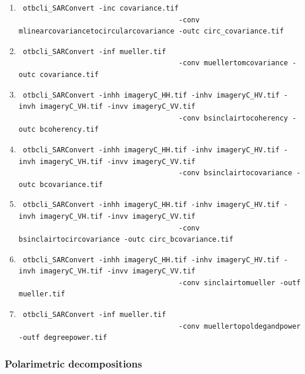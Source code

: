 \begin{enumerate}
\item \begin{verbatim} otbcli_SARConvert -inc covariance.tif 
									  -conv mlinearcovariancetocircularcovariance -outc circ_covariance.tif \end{verbatim}	
									  			
\item \begin{verbatim} otbcli_SARConvert -inf mueller.tif 
									  -conv muellertomcovariance -outc covariance.tif \end{verbatim}	
									  								  
\item \begin{verbatim} otbcli_SARConvert -inhh imageryC_HH.tif -inhv imageryC_HV.tif -invh imageryC_VH.tif -invv imageryC_VV.tif
									  -conv bsinclairtocoherency -outc bcoherency.tif \end{verbatim}
									  
\item \begin{verbatim} otbcli_SARConvert -inhh imageryC_HH.tif -inhv imageryC_HV.tif -invh imageryC_VH.tif -invv imageryC_VV.tif 
									  -conv bsinclairtocovariance -outc bcovariance.tif \end{verbatim}
									  
\item \begin{verbatim} otbcli_SARConvert -inhh imageryC_HH.tif -inhv imageryC_HV.tif -invh imageryC_VH.tif -invv imageryC_VV.tif
									  -conv bsinclairtocircovariance -outc circ_bcovariance.tif \end{verbatim}
									  
									  
\item \begin{verbatim} otbcli_SARConvert -inhh imageryC_HH.tif -inhv imageryC_HV.tif -invh imageryC_VH.tif -invv imageryC_VV.tif 
									  -conv sinclairtomueller -outf mueller.tif \end{verbatim}
									  
\item \begin{verbatim} otbcli_SARConvert -inf mueller.tif 
									  -conv muellertopoldegandpower -outf degreepower.tif \end{verbatim}
									  
\end{enumerate}

\subsubsection{Polarimetric decompositions}

